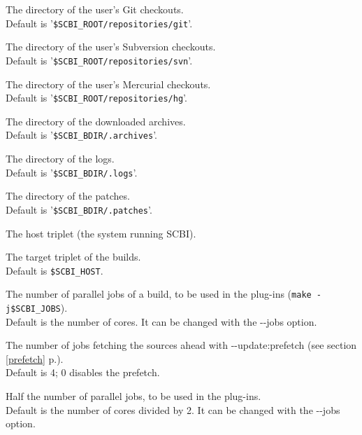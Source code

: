 \documentclass[a4paper,12pt,twoside]{article}
\let\olditem=\item
\def\myitem[#1]{\vspace{10pt}\olditem[#1]}
\newcommand{\code}[1]{\texttt{#1}}
\newcommand{\seeref}[1]{see section \ref{#1} p.\pageref{#1}}
\newcommand{\file}[1]{'{\texttt{#1}}'}
\newcommand{\ddash}{-{}-}
\begin{document}
\begin{description}[before=\let\item\myitem]
	\item[SCBI\_GIT\_REPO] The directory of the user's Git checkouts. \\ Default is \file{\$SCBI\_ROOT/repositories/git}.

	\item[SCBI\_SVN\_REPO] The directory of the user's Subversion checkouts. \\ Default is \file{\$SCBI\_ROOT/repositories/svn}.

	\item[SCBI\_HG\_REPO] The directory of the user's Mercurial checkouts. \\ Default is \file{\$SCBI\_ROOT/repositories/hg}.

	\item[SCBI\_ARCHIVES] The directory of the downloaded archives. \\Default is \file{\$SCBI\_BDIR/.archives}.

	\item[SCBI\_LOGS] The directory of the logs. \\Default is \file{\$SCBI\_BDIR/.logs}.

	\item[SCBI\_PATCH] The directory of the patches. \\Default is \file{\$SCBI\_BDIR/.patches}.

	\item[SCBI\_HOST] The host triplet (the system running SCBI).

	\item[SCBI\_TARGET] The target triplet of the builds. \\Default is \code{\$SCBI\_HOST}.

	\item[SCBI\_JOBS] The number of parallel jobs of a build, to be used in the plug-ins (\code{make -j\$SCBI\_JOBS}). \\Default is the number of cores. It can be changed with the \ddash{}jobs option.
	\label{njobs}
	\item[SCBI\_PREFETCH\_JOBS] The number of jobs fetching the sources ahead with \ddash{}update:prefetch (\seeref{prefetch}). \\Default is 4; 0 disables the prefetch.
	\item[SCBI\_HALF\_JOBS] Half the number of parallel jobs, to be used in the plug-ins. \\Default is the number of cores divided by 2. It can be changed with the \ddash{}jobs option.\label{half-njobs}


\end{description}
\end{document}

